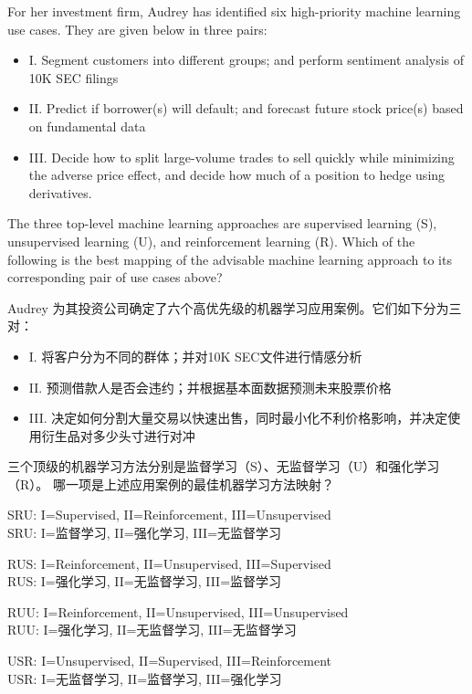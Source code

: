 \documentclass{article}
\newcounter{question} %
\begin{document}
\begin{question}
    For her investment firm, Audrey has identified six high-priority machine learning use cases. They are given below in three pairs:
    \begin{itemize}
        \item I. Segment customers into different groups; and perform sentiment analysis of 10K SEC filings
        \item II. Predict if borrower(s) will default; and forecast future stock price(s) based on fundamental data
        \item III. Decide how to split large-volume trades to sell quickly while minimizing the adverse price effect, and decide how much of a position to hedge using derivatives.
    \end{itemize}
    The three top-level machine learning approaches are supervised learning (S), unsupervised learning (U), and reinforcement learning (R).
    Which of the following is the best mapping of the advisable machine learning approach to its corresponding pair of use cases above?

    Audrey 为其投资公司确定了六个高优先级的机器学习应用案例。它们如下分为三对：
    \begin{itemize}
        \item I. 将客户分为不同的群体；并对10K SEC文件进行情感分析
        \item II. 预测借款人是否会违约；并根据基本面数据预测未来股票价格
        \item III. 决定如何分割大量交易以快速出售，同时最小化不利价格影响，并决定使用衍生品对多少头寸进行对冲
    \end{itemize}
    三个顶级的机器学习方法分别是监督学习（S）、无监督学习（U）和强化学习（R）。
    哪一项是上述应用案例的最佳机器学习方法映射？
\end{question}

\begin{choices}
    \item SRU: I=Supervised, II=Reinforcement, III=Unsupervised
    \\SRU: I=监督学习, II=强化学习, III=无监督学习
    \item RUS: I=Reinforcement, II=Unsupervised, III=Supervised
    \\RUS: I=强化学习, II=无监督学习, III=监督学习
    \item RUU: I=Reinforcement, II=Unsupervised, III=Unsupervised
    \\RUU: I=强化学习, II=无监督学习, III=无监督学习
    \item USR: I=Unsupervised, II=Supervised, III=Reinforcement
    \\USR: I=无监督学习, II=监督学习, III=强化学习
\end{choices}
\end{document}
